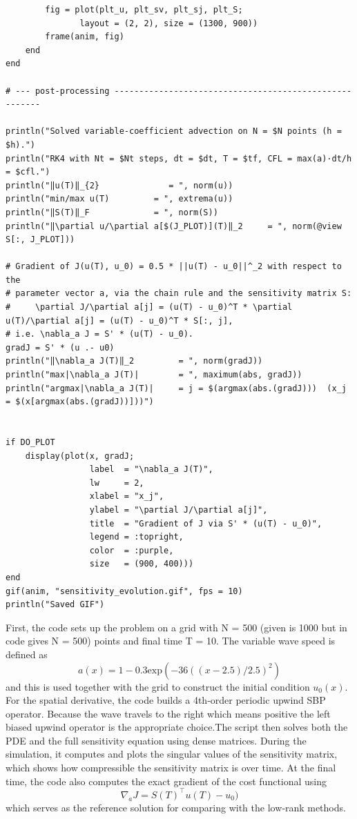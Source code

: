 \documentclass[11pt]{report}
\begin{document}
\begin{verbatim}
        fig = plot(plt_u, plt_sv, plt_sj, plt_S;
               layout = (2, 2), size = (1300, 900))
        frame(anim, fig)             
    end
end

# --- post-processing -------------------------------------------------------

println("Solved variable-coefficient advection on N = $N points (h = $h).")
println("RK4 with Nt = $Nt steps, dt = $dt, T = $tf, CFL = max(a)·dt/h = $cfl.")
println("‖u(T)‖_{2}              = ", norm(u))
println("min/max u(T)         = ", extrema(u))
println("‖S(T)‖_F             = ", norm(S))
println("‖\partial u/\partial a[$(J_PLOT)](T)‖_2     = ", norm(@view S[:, J_PLOT]))

# Gradient of J(u(T), u_0) = 0.5 * ||u(T) - u_0||^_2 with respect to the
# parameter vector a, via the chain rule and the sensitivity matrix S:
#     \partial J/\partial a[j] = (u(T) - u_0)^T * \partial u(T)/\partial a[j] = (u(T) - u_0)^T * S[:, j],
# i.e. \nabla_a J = S' * (u(T) - u_0).
gradJ = S' * (u .- u0)
println("‖\nabla_a J(T)‖_2         = ", norm(gradJ))
println("max|\nabla_a J(T)|        = ", maximum(abs, gradJ))
println("argmax|\nabla_a J(T)|     = j = $(argmax(abs.(gradJ)))  (x_j = $(x[argmax(abs.(gradJ))]))")


if DO_PLOT
    display(plot(x, gradJ;
                 label  = "\nabla_a J(T)",
                 lw     = 2,
                 xlabel = "x_j",
                 ylabel = "\partial J/\partial a[j]",
                 title  = "Gradient of J via S' * (u(T) - u_0)",
                 legend = :topright,
                 color  = :purple,
                 size   = (900, 400)))
end
gif(anim, "sensitivity_evolution.gif", fps = 10)
println("Saved GIF")
\end{verbatim}

First, the code sets up the problem on a grid with 
N = 500 (given is 1000 but in code gives N = 500)
 points and final time 
T = 10. The variable wave speed is defined as
\[
a(x) = 1 - 0.3\text{exp}(-36((x-2.5)/2.5)^2)
\]
and this is used together with the grid to construct the initial condition $u_0(x)$. For the spatial derivative, the code builds a 4th‑order periodic upwind SBP operator. Because the wave travels to the right which means positive the left biased upwind operator is the appropriate choice.The script then solves both the PDE and the full sensitivity equation using dense matrices. During the simulation, it computes and plots the singular values of the sensitivity matrix, which shows how compressible the sensitivity matrix is over time. At the final time, the code also computes the exact gradient of the cost functional using
\[
\nabla _a J = S(T)^\top u(T)-u_0
)
\]
which serves as the reference solution for comparing with the low‑rank methods.
\end{document}
